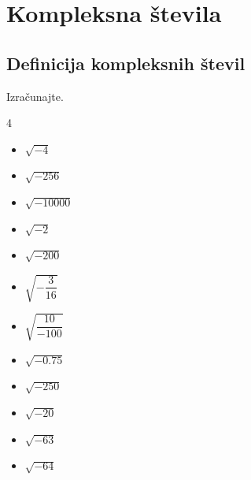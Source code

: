 \chapter{Kompleksna števila}


    \section{Definicija kompleksnih števil}


    


        \newpage

            \begin{naloga}
                Izračunajte.
                \begin{multicols}{4}
                    
                    \begin{itemize}
                        \item $\sqrt{-4}$ 
                        \item $\sqrt{-256}$ 
                        \item $\sqrt{-10000}$ 
                        \item $\sqrt{-2}$ 
                        \item $\sqrt{-200}$ 
                        \item $\sqrt{-\dfrac{3}{16}}$ 
                        \item $\sqrt{\dfrac{10}{-100}}$ 
                        \item $\sqrt{-0.75}$ 
                        \item $\sqrt{-250}$ 
                        \item $\sqrt{-20}$ 
                        \item $\sqrt{-63}$ 
                        \item $\sqrt{-64}$ 
                    \end{itemize}

                \end{multicols}

            \end{naloga}


